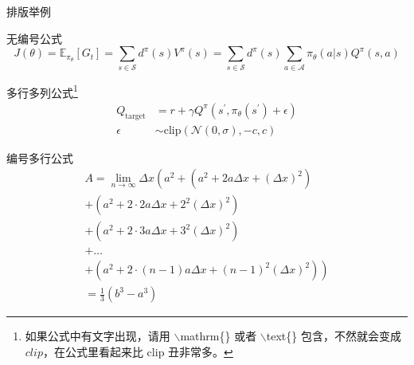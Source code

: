 \documentclass{beamer}
\begin{document}
\begin{frame}{排版举例}
    \begin{exampleblock}{无编号公式} %
        \begin{equation*}
            J(\theta) = \mathbb{E}_{\pi_\theta}[G_t] = \sum_{s\in\mathcal{S}} d^\pi (s)V^\pi(s)=\sum_{s\in\mathcal{S}} d^\pi(s)\sum_{a\in\mathcal{A}}\pi_\theta(a|s)Q^\pi(s,a)
        \end{equation*}
    \end{exampleblock}
    \begin{exampleblock}{多行多列公式\footnote{如果公式中有文字出现，请用 $\backslash$mathrm\{\} 或者 $\backslash$text\{\} 包含，不然就会变成 $clip$，在公式里看起来比 $\mathrm{clip}$ 丑非常多。}}
        \begin{align}
            Q_\mathrm{target}&=r+\gamma Q^\pi(s^\prime, \pi_\theta(s^\prime)+\epsilon)\\
            \epsilon&\sim\mathrm{clip}(\mathcal{N}(0, \sigma), -c, c)\nonumber
        \end{align}
    \end{exampleblock}
\end{frame}

\begin{frame}
    \begin{exampleblock}{编号多行公式}
        \begin{multline}
            A=\lim_{n\rightarrow\infty}\Delta x\left(a^{2}+\left(a^{2}+2a\Delta x+\left(\Delta x\right)^{2}\right)\right.\label{eq:reset}\\
            +\left(a^{2}+2\cdot2a\Delta x+2^{2}\left(\Delta x\right)^{2}\right)\\
            +\left(a^{2}+2\cdot3a\Delta x+3^{2}\left(\Delta x\right)^{2}\right)\\
            +\ldots\\
            \left.+\left(a^{2}+2\cdot(n-1)a\Delta x+(n-1)^{2}\left(\Delta x\right)^{2}\right)\right)\\
            =\frac{1}{3}\left(b^{3}-a^{3}\right)
        \end{multline}
    \end{exampleblock}
\end{frame}
\end{document}
